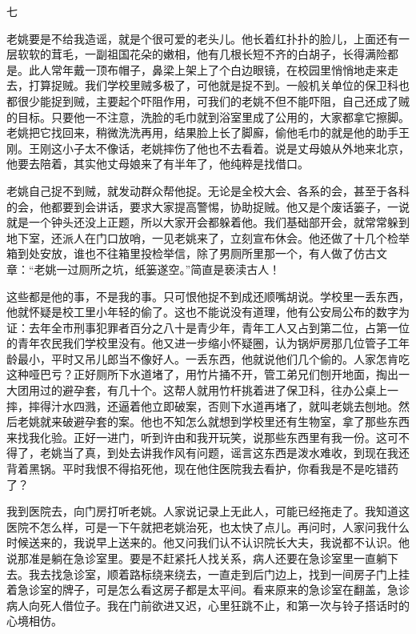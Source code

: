 七 
 
 老姚要是不给我造谣，就是个很可爱的老头儿。他长着红扑扑的脸儿，上面还有一层软软的茸毛，一副祖国花朵的嫩相，他有几根长短不齐的白胡子，长得满险都是。此人常年戴一顶布帽子，鼻梁上架上了个白边眼镜，在校园里悄悄地走来走去，打算捉贼。我们学校里贼多极了，可他就是捉不到。一般机关单位的保卫科也都很少能捉到贼，主要起个吓阻作用，可我们的老姚不但不能吓阻，自己还成了贼的目标。只要他一不注意，洗脸的毛巾就到浴室里成了公用的，大家都拿它擦脚。老姚把它找回来，稍微洗洗再用，结果脸上长了脚廯，偷他毛巾的就是他的助手王刚。王刚这小子太不像话，老姚摔伤了他也不去看着。说是丈母娘从外地来北京，他要去陪着，其实他丈母娘来了有半年了，他纯粹是找借口。 
 
 老姚自己捉不到贼，就发动群众帮他捉。无论是全校大会、各系的会，甚至于各科的会，他都要到会讲话，要求大家提高警惕，协助捉贼。他又是个废话篓子，一说就是一个钟头还没上正题，所以大家开会都躲着他。我们基础部开会，就常常躲到地下室，还派人在门口放哨，一见老姚来了，立刻宣布休会。他还做了十几个检举箱到处安放，谁也不往箱里投检举信，除了男厕所里那一个，有人做了仿古文章：“老姚一过厕所之坑，纸篓遂空。”简直是亵渎古人！ 
 
 这些都是他的事，不是我的事。只可恨他捉不到成还顺嘴胡说。学校里一丢东西，他就怀疑是校工里小年轻的偷了。这也不能说没有道理，他有公安局公布的数字为证：去年全市刑事犯罪者百分之八十是青少年，青年工人又占到第二位，占第一位的青年农民我们学校里没有。他又进一步缩小怀疑圈，认为锅炉房那几位管子工年龄最小，平时又吊儿郎当不像好人。一丢东西，他就说他们几个偷的。人家怎肯吃这种哑巴亏？正好厕所下水道堵了，用竹片捅不开，管工弟兄们刨开地面，掏出一大团用过的避孕套，有几十个。这帮人就用竹杆挑着进了保卫科，往办公桌上一摔，摔得汁水四溅，还逼着他立即破案，否则下水道再堵了，就叫老姚去刨地。然后老姚就来破避孕套的案。他也不知怎么就想到学校里还有生物室，拿了那些东西来找我化验。正好一进门，听到许由和我开玩笑，说那些东西里有我一份。这可不得了，老姚当了真，到处去讲我作风有问题，谣言这东西是泼水难收，到现在我还背着黑锅。平时我恨不得掐死他，现在他住医院我去看护，你看我是不是吃错药了？ 
 
 我到医院去，向门房打听老姚。人家说记录上无此人，可能已经拖走了。我知道这医院不怎么样，可是一下午就把老姚治死，也太快了点儿。再问时，人家问我什么时候送来的，我说早上送来的。他又问我们认不认识院长大夫，我说都不认识。他说那准是躺在急诊室里。要是不赶紧托人找关系，病人还要在急诊室里一直躺下去。我去找急诊室，顺着路标绕来绕去，一直走到后门边上，找到一间房子门上挂着急诊室的牌子，可是怎么看这房子都是太平间。看来原来的急诊室在翻盖，急诊病人向死人借位子。我在门前欲进又迟，心里狂跳不止，和第一次与铃子搭话时的心境相仿。 
 
